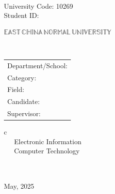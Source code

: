 \newpage

\pagestyle{empty}

\\
\begin{flushright}
 {\large University Code: 10269}\\	
 {\large Student ID: \hide{\stuid}}
\end{flushright}



\vskip 1cm

\begin{center}
{\Huge $\mathbb{EAST}\,\mathbb{CHINA}\,\mathbb{NORMAL}\,
\mathbb{UNIVERSITY}$}
\end{center}

\vskip 2cm

\begin{center}
\bfseries{\scshape{\huge \thesisTitleEn}}\\
\end{center}

\vskip 1.5cm {\large
\begin{center}
\begin{tabular}{l}
Department/School:\\
Category:\\
Field:\\
Candidate:\\
Supervisor:

\end{tabular}
\begin{tabular}c
~~~\schoolEn  \\
\hline ~~~Electronic Information\\
\hline ~~~Computer Technology\\
\hline ~~~  \hide{\authornameEn}\\
\hline ~~~  \hide{\directorEn}\\
\hline
\end{tabular}
\end{center}}

\vskip 10mm

\begin{center}
{\sihao May, 2025}
\end{center}
